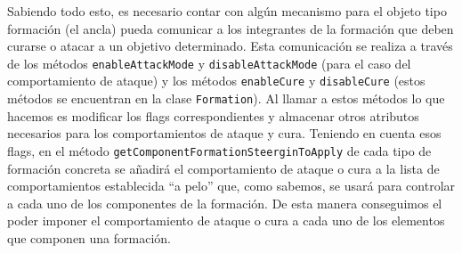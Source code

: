 Sabiendo todo esto, es necesario contar con algún mecanismo para el objeto tipo formación (el ancla) pueda comunicar a los integrantes de la formación que deben curarse o atacar a un objetivo determinado. Esta comunicación se realiza a través de los métodos \texttt{enableAttackMode} y \texttt{disableAttackMode} (para el caso del comportamiento de ataque) y los métodos \texttt{enableCure} y \texttt{disableCure} (estos métodos se encuentran en la clase \texttt{Formation}). Al llamar a estos métodos lo que hacemos es modificar los flags correspondientes y almacenar otros atributos necesarios para los comportamientos de ataque y cura. Teniendo en cuenta esos flags, en el método \texttt{getComponentFormationSteerginToApply} de cada tipo de formación concreta se añadirá el comportamiento de ataque o cura a la lista de comportamientos establecida ``a pelo'' que, como sabemos, se usará para controlar a cada uno de los componentes de la formación. De esta manera conseguimos el poder imponer el comportamiento de ataque o cura a cada uno de los elementos que componen una formación.

